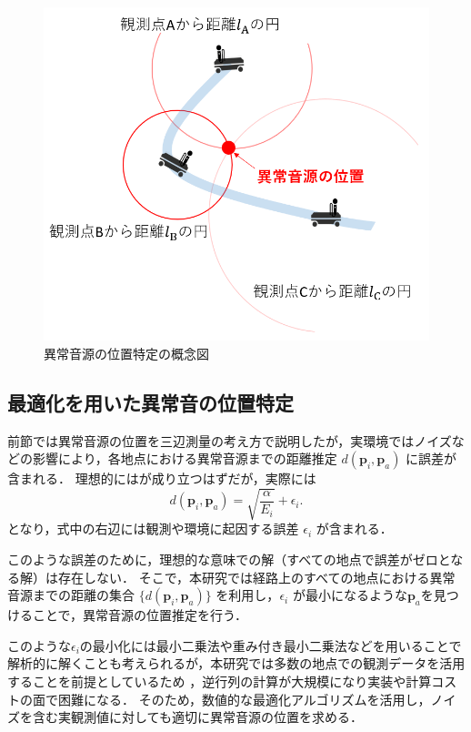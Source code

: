 \documentclass[../main]{subfiles}
\begin{document}
\begin{figure}[t]
    \centering
    \includegraphics[keepaspectratio, width=1.0\linewidth]{chap3/localization.png}
    \caption{異常音源の位置特定の概念図}
    \label{fig:localization}
  \end{figure}

\subsection{最適化を用いた異常音の位置特定}

前節では異常音源の位置を三辺測量の考え方で説明したが，実環境ではノイズなどの影響により，各地点における異常音源までの距離推定 $d(\mathbf{p}_i,\mathbf{p}_a)$ に誤差が含まれる．
理想的にはが成り立つはずだが，実際には
\begin{equation}
    d(\mathbf{p}_i, \mathbf{p}_a) = \sqrt{\frac{\alpha}{E_i}} + \epsilon_i.
\end{equation}
となり，式中の右辺には観測や環境に起因する誤差 $\epsilon_i$ が含まれる．

このような誤差のために，理想的な意味での解（すべての地点で誤差がゼロとなる解）は存在しない．
そこで，本研究では経路上のすべての地点における異常音源までの距離の集合 $\{d(\mathbf{p}_i, \mathbf{p}_a)\}$ を利用し，$\epsilon_i$ が最小になるような\( \mathbf{p}_a \)を見つけることで，異常音源の位置推定を行う．

このような$\epsilon_i$の最小化には最小二乗法や重み付き最小二乗法などを用いることで解析的に解くことも考えられるが，本研究では多数の地点での観測データを活用することを前提としているため
，逆行列の計算が大規模になり実装や計算コストの面で困難になる．
そのため，数値的な最適化アルゴリズムを活用し，ノイズを含む実観測値に対しても適切に異常音源の位置を求める．
\end{document}

